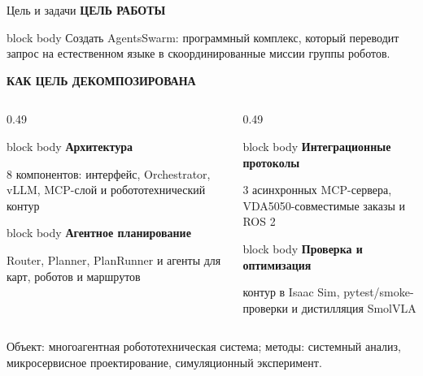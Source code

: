 \documentclass[aspectratio=169,11pt]{beamer}
\newcommand{\tightkeybox}[2]{%
  \begin{beamercolorbox}[wd=0.98\linewidth,sep=0.09cm]{block body}
    {\color{hseblue}\bfseries\small #1}\par
    \vspace{0.02cm}
    {\scriptsize #2}
  \end{beamercolorbox}
}
\newcommand{\sectiontag}[1]{%
  {\scriptsize\bfseries\color{hsegray}\MakeUppercase{#1}}\par\vspace{0.06cm}
}
\begin{document}
\begin{frame}{Цель и задачи}
  \sectiontag{Цель работы}
  \begin{beamercolorbox}[wd=\linewidth,sep=0.14cm]{block body}
    \normalsize Создать AgentsSwarm: программный комплекс, который переводит
    запрос на естественном языке в скоординированные миссии группы роботов.
  \end{beamercolorbox}
  \vspace{0.22cm}

  \sectiontag{Как цель декомпозирована}

  \begin{columns}[T,onlytextwidth]
    \begin{column}{0.49\textwidth}
      \begin{minipage}[t][1.60cm][t]{\linewidth}
        \tightkeybox{Архитектура}{8 компонентов: интерфейс, Orchestrator, vLLM, MCP-слой и робототехнический контур}
      \end{minipage}
      \vspace{0.11cm}
      \tightkeybox{Агентное планирование}{Router, Planner, PlanRunner и агенты для карт, роботов и маршрутов}
    \end{column}
    \begin{column}{0.49\textwidth}
      \begin{minipage}[t][1.60cm][t]{\linewidth}
        \tightkeybox{Интеграционные протоколы}{3 асинхронных MCP-сервера, VDA5050-совместимые заказы и ROS 2}
      \end{minipage}
      \vspace{0.11cm}
      \tightkeybox{Проверка и оптимизация}{контур в Isaac Sim, pytest/smoke-проверки и дистилляция SmolVLA}
    \end{column}
  \end{columns}

  \vspace{0.16cm}
  {\scriptsize\color{hsegray}
  Объект: многоагентная робототехническая система; методы: системный анализ,
  микросервисное проектирование, симуляционный эксперимент.}
\end{frame}
\end{document}
